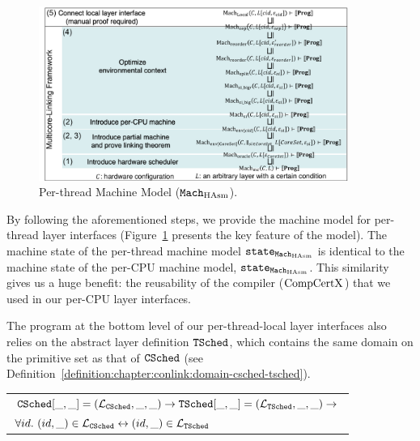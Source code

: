 \begin{figure}
\begin{center}
\includegraphics[width=0.9\textwidth, page=9]{figs/conlink/concurrent_linking}
\end{center}
\caption{Per-thread Machine Model (${\mathrm{\texttt{Mach}}}_{\mathrm{HAsm}}$).}
\label{fig:chapter:conlink:per-thread-machine-model}
\end{figure}

By following the aforementioned steps, we provide the machine model for per-thread layer interfaces (Figure~\ref{fig:chapter:conlink:per-thread-machine-model} presents the key feature of the model). 
The machine state of the per-thread machine model ${\mathrm{\texttt{state}}}_{{\mathrm{\texttt{Mach}}}_{\mathrm{HAsm}}}$ is identical
 to the machine state of the per-CPU machine model, ${\mathrm{\texttt{state}}}_{{\mathrm{\texttt{Mach}}}_{\mathrm{HAsm}}}$.
This similarity gives us a huge benefit: the reusability of the compiler ($\mathrm{CompCertX}$) 
that we  used in our per-CPU layer interfaces. 

The program at the bottom level of our per-thread-local layer interfaces also relies on the abstract layer definition ${{\mathrm{\texttt{TSched}}}}$, which contains the same domain on the primitive set as that of ${{\mathrm{\texttt{CSched}}}}$ (see Definition~\ref{definition:chapter:conlink:domain-csched-tsched}).

\begin{definition}
\label{definition:chapter:conlink:domain-csched-tsched}
\begin{tabular}{P{0.95\textwidth}}
${{\mathrm{\texttt{CSched}}}}[\_, \_] = (\mathcal{L}_{{{\mathrm{\texttt{CSched}}}}}, \_ , \_) \rightarrow {{\mathrm{\texttt{TSched}}}}[\_, \_] = (\mathcal{L}_{{{\mathrm{\texttt{TSched}}}}}, \_ , \_) \rightarrow$\\
$\forall id.\ (id, \_) \in \Layer_{\CSched}  \leftrightarrow (id, \_) \in \Layer_{\TSched} $\\
\end{tabular}
\end{definition}

